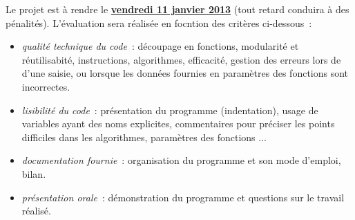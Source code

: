 \documentclass[10pt]{article}
\begin{document}
Le projet est \`a rendre le \underline{\bf vendredi 11 janvier 2013} 
(tout retard conduira \`a des p\'enalit\'es). L'\'evaluation sera r\'ealis\'ee en focntion 
des crit\`eres ci-dessous~:
\begin{itemize}

\item  \textit{qualit\'e technique du code}~: d\'ecoupage en fonctions, modularit\'e et r\'eutilisabit\'e, instructions, algorithmes, efficacit\'e, gestion des erreurs lors de d'une saisie, ou lorsque les donn\'ees fournies en param\`etres des fonctions sont incorrectes.

\item \textit{lisibilit\'e du code}~: pr\'esentation du programme (indentation), usage de variables ayant des noms explicites, commentaires pour pr\'eciser les points difficiles dans les algorithmes, param\`etres des fonctions $\ldots$ 

\item \textit{documentation fournie}~: organisation du programme et son mode d'emploi, bilan.

\item \textit{pr\'esentation orale}~: d\'emonstration du programme et questions sur le travail r\'ealis\'e.


\end{itemize}
\end{document}
